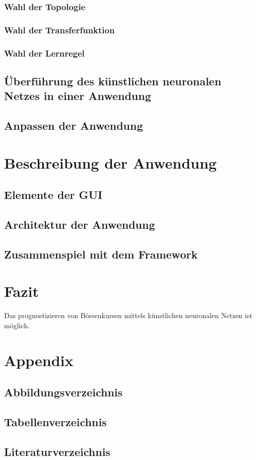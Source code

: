 \documentclass[11pt,a4paper]{scrreprt}
\begin{document}
		\subsection{Wahl der Topologie} %
		\subsection{Wahl der Transferfunktion} %
		\subsection{Wahl der Lernregel} %
	\section{Überführung des künstlichen neuronalen Netzes in einer Anwendung}
	\section{Anpassen der Anwendung} %

\chapter{Beschreibung der Anwendung} %
	\section{Elemente der GUI} %
	\section{Architektur der Anwendung} %
	\section{Zusammenspiel mit dem Framework} %

\chapter{Fazit} %
Das prognostizieren von Börsenkursen mittels künstlichen neuronalen Netzen ist möglich.

\chapter{Appendix}
	\section{Abbildungsverzeichnis}
	\section{Tabellenverzeichnis}
	\section{Literaturverzeichnis}
\end{document}

